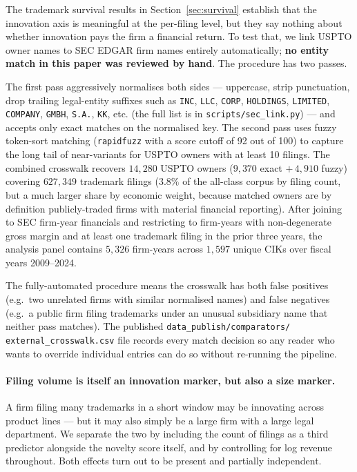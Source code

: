 \documentclass[11pt]{article}
\begin{document}
The trademark survival results in Section~\ref{sec:survival} establish
that the innovation axis is meaningful at the per-filing level, but
they say nothing about whether innovation pays the firm a financial
return. To test that, we link USPTO owner names to SEC EDGAR firm
names entirely automatically; \textbf{no entity match in this paper
was reviewed by hand}. The procedure has two passes.

The first pass aggressively normalises both sides --- uppercase,
strip punctuation, drop trailing legal-entity suffixes such as
\texttt{INC}, \texttt{LLC}, \texttt{CORP}, \texttt{HOLDINGS},
\texttt{LIMITED}, \texttt{COMPANY}, \texttt{GMBH}, \texttt{S.A.},
\texttt{KK}, etc. (the full list is in
\texttt{scripts/sec\_link.py})  --- and accepts only exact matches
on the normalised key. The second pass uses fuzzy token-sort
matching (\texttt{rapidfuzz} with a score cutoff of 92 out of 100)
to capture the long tail of near-variants for USPTO owners with at
least 10 filings. The combined crosswalk recovers $14{,}280$ USPTO
owners ($9{,}370$ exact $+\,4{,}910$ fuzzy) covering $627{,}349$
trademark filings ($3.8\%$ of the all-class corpus by filing count,
but a much larger share by economic weight, because matched owners
are by definition publicly-traded firms with material financial
reporting). After joining to SEC firm-year financials and
restricting to firm-years with non-degenerate gross margin and at
least one trademark filing in the prior three years, the analysis
panel contains $5{,}326$ firm-years across $1{,}597$ unique CIKs
over fiscal years 2009--2024.

The fully-automated procedure means the crosswalk has both
false positives (e.g.\ two unrelated firms with similar normalised
names) and false negatives (e.g.\ a public firm filing
trademarks under an unusual subsidiary name that neither pass
matches). The published \texttt{data\_publish/comparators/
external\_crosswalk.csv} file records every match decision so any
reader who wants to override individual entries can do so without
re-running the pipeline.

\paragraph{Filing volume is itself an innovation marker, but also a
size marker.} A firm filing many trademarks in a short window may be
innovating across product lines --- but it may also simply be a large
firm with a large legal department. We separate the two by including
the count of filings as a third predictor alongside the novelty score
itself, and by controlling for log revenue throughout. Both effects
turn out to be present and partially independent.
\end{document}
